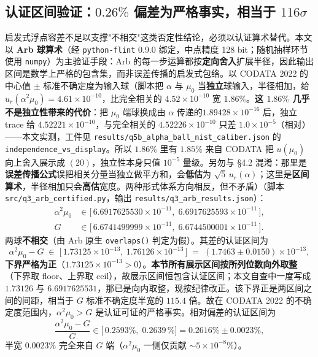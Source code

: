 \documentclass[12pt,a4paper]{article}
\begin{document}
\subsection{认证区间验证：$0.26\%$ 偏差为严格事实，相当于 $116\sigma$}

启发式浮点容差不足以支撑"不相交"这类否定性结论，必须以认证算术替代。本文以 \textbf{Arb 球算术}\cite{johansson2017}（经 \texttt{python-flint} 0.9.0 绑定\cite{pythonflint}，中点精度 128 bit；随机抽样环节使用 \texttt{numpy}\cite{numpy}）为主验证手段：Arb 的每一步运算都按\textbf{定向舍入}扩展半径，因此输出区间是数学上严格的包含集，而非误差传播的启发式包络。以 CODATA 2022 的中心值 $\pm$ 标准不确定度为输入球（脚本把 $\alpha$ 与 $\mu_0$ 当\textbf{独立}球输入，半径相加，给 $u_r(\alpha^2\mu_0)=4.61\times10^{-10}$，比完全相关的 $4.52\times10^{-10}$ 宽 $1.86\%$。\textbf{这 $1.86\%$ 几乎不是独立性带来的代价}：把 $\mu_0$ 端球换成由 $\alpha$ 传递的$1.89428\times10^{-16}$ 后，独立 trace 给 $4.52221\times10^{-10}$，与完全相关的 $4.52226\times10^{-10}$ 只差 $1.0\times10^{-5}$（相对）——本文实测，工件见 \texttt{results/q5b\_\allowbreak{}alpha\_\allowbreak{}ball\_\allowbreak{}nist\_\allowbreak{}caliber.json} 的 \texttt{independence\_\allowbreak{}vs\_\allowbreak{}display}。所以 $1.86\%$ 里有 $1.85\%$ 来自 CODATA 把 $u(\mu_0)$ 向上舍入展示成 $(20)$，独立性本身只值 $10^{-5}$ 量级。另勿与 §4.2 混淆：那里是\textbf{误差传播公式}误把相关分量当独立做平方和，会\textbf{低估}为 $\sqrt{5}\,u_r(\alpha)$；这里是\textbf{区间算术}，半径相加只会\textbf{高估}宽度。两种形式体系方向相反，但不矛盾）（脚本 \texttt{src/q3\_\allowbreak{}arb\_\allowbreak{}certified.py}，输出 \texttt{results/q3\_\allowbreak{}arb\_\allowbreak{}results.json}）：
\begin{align}
  \alpha^2\mu_0 &\in \bigl[\,6.6917625530\times10^{-11},\; 6.6917625593\times10^{-11}\,\bigr], \\
  G &\in \bigl[\,6.6741499999\!\times10^{-11},\; 6.6744500001\!\times10^{-11}\,\bigr].
\end{align}
两球\textbf{不相交}（由 Arb 原生 \texttt{overlaps()} 判定为假）。其差的认证区间为
\[
  \alpha^2\mu_0 - G \;\in\; \big[\,1.73125\times10^{-13},\ 1.76126\times10^{-13}\,\big] \;=\; (1.7463 \pm 0.0150)\times10^{-13},
\]
\textbf{下界严格为正}（$1.73125\times10^{-13} > 0$）。\textbf{本节所有展示区间按所列位数向外取整}（下界取 floor、上界取 ceil），故展示区间恒包含认证区间；本文自查中一度写成 $1.73126$ 与 $6.6917625531$，那已是向内取整，现按纪律改正。该下界正是两区间之间的间距，相当于 $G$ 标准不确定度半宽的 $115.4$ 倍。故在 CODATA 2022 的不确定度范围内，$\alpha^2\mu_0 > G$ 是认证可证的严格事实。相对偏差的认证区间为
\[
  \frac{\alpha^2\mu_0 - G}{G} \in \bigl[\,0.2593\%,\; 0.2639\,\%\bigr] = 0.2616\% \pm 0.0023\%,
\]
半宽 $0.0023\%$ 完全来自 $G$ 端（$\alpha^2\mu_0$ 一侧仅贡献 $\sim 5\times10^{-8}\%$）。
\end{document}

